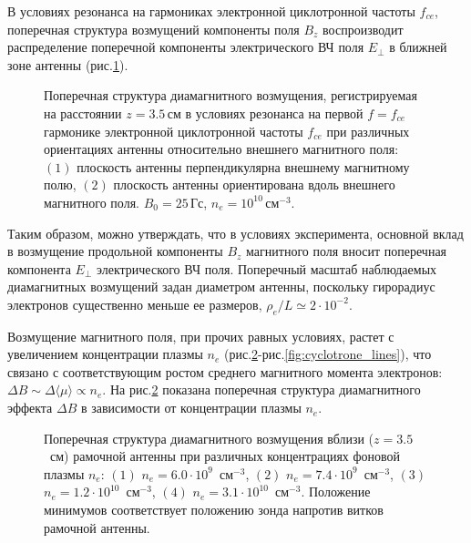 \documentclass[autoref,10pt]{disser}
\begin{document}
В условиях резонанса на гармониках электронной циклотронной частоты $f_{ce}$, поперечная структура возмущений компоненты поля $B_{z}$  воспроизводит распределение поперечной компоненты электрического ВЧ поля $E_{\perp}$ в ближней зоне антенны (\mbox{рис.\ref{fig:tr+par_distr}}).
\begin{figure}[H]
    \centering
    \def\svgwidth{0.6\columnwidth} %
    
    \caption{Поперечная структура диамагнитного возмущения, регистрируемая на расстоянии $z=3.5$\,см в условиях резонанса на первой $f=f_{ce}$  гармонике электронной циклотронной частоты $f_{ce}$ при различных ориентациях антенны относительно внешнего магнитного поля: $(1)$ плоскость антенны перпендикулярна внешнему магнитному полю, $(2)$ плоскость антенны ориентирована вдоль внешнего магнитного поля. $B_{0}=25$\,Гс, $n_{e}=10^{10}$\,см$^{-3}$.}
    \label{fig:tr+par_distr}
\end{figure}

Таким образом, можно утверждать, что в условиях эксперимента, основной вклад в возмущение продольной компоненты  $B_{z}$ магнитного поля вносит поперечная компонента $E_{\perp}$ электрического ВЧ поля. Поперечный масштаб наблюдаемых диамагнитных возмущений задан диаметром антенны, поскольку гирорадиус электронов существенно меньше ее размеров, $\rho_e/L \simeq2\cdot 10^{-2}$. 

Возмущение магнитного поля, при прочих равных условиях, растет с увеличением концентрации плазмы $n_{e}$ (\mbox{рис.\ref{fig:ne_distr}-рис.\ref{fig:cyclotrone_lines}}), что связано с соответствующим ростом среднего магнитного момента электронов: $\Delta{}B\sim{}\Delta{}\langle{}\mu{}\rangle{}\propto{}n_{e}$.
На \mbox{рис.\ref{fig:ne_distr}} показана поперечная структура диамагнитного эффекта $\Delta{}B$ в зависимости от концентрации плазмы $n_{e}$. 
\begin{figure}[H]
   \centering
   \def\svgwidth{0.6\columnwidth} %
   
   \vspace{0.5cm}
   \caption{Поперечная структура диамагнитного возмущения вблизи ($z=3.5$~см) рамочной антенны при различных концентрациях фоновой плазмы $n_{e}$: $(1)$ $n_{e}=6.0\cdot{}10^{9}$~см$^{-3}$, $(2)$ $n_{e}=7.4\cdot{}10^{9}$~см$^{-3}$, $(3)$  $n_{e}=1.2\cdot{}10^{10}$~см$^{-3}$, $(4)$ $n_{e}=3.1\cdot{}10^{10}$~см$^{-3}$. Положение минимумов соответствует положению зонда напротив витков рамочной антенны.}
   \label{fig:ne_distr}
\end{figure}
\end{document}

